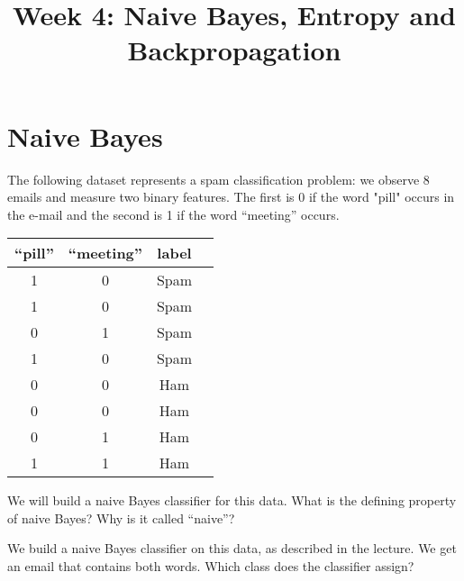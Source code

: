 \documentclass[11pt]{article}
\title{Week 4: Naive Bayes, Entropy and Backpropagation}
\begin{document}
\maketitle

\section{Naive Bayes}

The following dataset represents a spam classification problem: we observe 8 emails and measure two binary features. The first is 0 if the word "pill" occurs in the e-mail and the second is 1 if the word ``meeting'' occurs. 

\begin{center}
	\begin{tabular}{c c c c}
		 ``pill'' &``meeting'' & label\\
		\hline
		  1 & 0 & Spam \\
		  1 & 0 & Spam \\
		  0 & 1 & Spam \\
		  1 & 0 & Spam \\
		  0 & 0 & Ham \\
		  0 & 0 & Ham \\
		  0 & 1 & Ham\\
		  1 & 1 & Ham \\
		\hline
	\end{tabular}
\end{center}

We will build a naive Bayes classifier for this data. What is the defining property of naive Bayes? Why is it called ``naive''?



We build a naive Bayes classifier on this data, as described in the lecture. We get an email that contains both words. Which class does the classifier assign?
\end{document}
